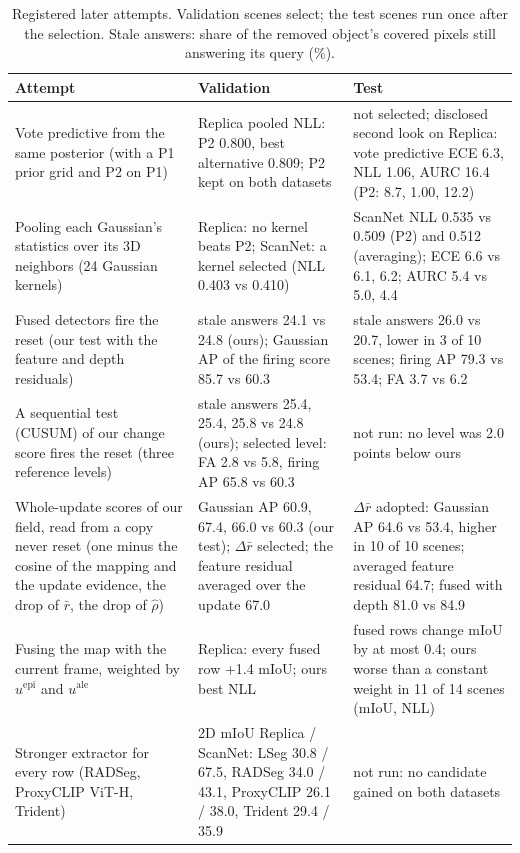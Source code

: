 \documentclass[journal]{IEEEtran}
\begin{document}
\begin{table}[t]
\centering
\caption{Registered later attempts. Validation scenes select; the test scenes run once after the selection. Stale answers: share of the removed object's covered pixels still answering its query (\%).}
\label{tab:attempts}
\footnotesize
\setlength{\tabcolsep}{3pt}
\begin{tabular}{@{}p{}p{}p{}@{}}
\toprule
Attempt & Validation & Test\\
\midrule
Vote predictive from the same posterior (with a P1 prior grid and P2 on P1) & Replica pooled NLL: P2 0.800, best alternative 0.809; P2 kept on both datasets & not selected; disclosed second look on Replica: vote predictive ECE 6.3, NLL 1.06, AURC 16.4 (P2: 8.7, 1.00, 12.2)\\
Pooling each Gaussian's statistics over its 3D neighbors (24 Gaussian kernels) & Replica: no kernel beats P2; ScanNet: a kernel selected (NLL 0.403 vs 0.410) & ScanNet NLL 0.535 vs 0.509 (P2) and 0.512 (averaging); ECE 6.6 vs 6.1, 6.2; AURC 5.4 vs 5.0, 4.4\\
Fused detectors fire the reset (our test with the feature and depth residuals) & stale answers 24.1 vs 24.8 (ours); Gaussian AP of the firing score 85.7 vs 60.3 & stale answers 26.0 vs 20.7, lower in 3 of 10 scenes; firing AP 79.3 vs 53.4; FA 3.7 vs 6.2\\
A sequential test (CUSUM) of our change score fires the reset (three reference levels) & stale answers 25.4, 25.4, 25.8 vs 24.8 (ours); selected level: FA 2.8 vs 5.8, firing AP 65.8 vs 60.3 & not run: no level was 2.0 points below ours\\
Whole-update scores of our field, read from a copy never reset (one minus the cosine of the mapping and the update evidence, the drop of $\bar r$, the drop of $\hat\rho$) & Gaussian AP 60.9, 67.4, 66.0 vs 60.3 (our test); $\Delta\bar r$ selected; the feature residual averaged over the update 67.0 & $\Delta\bar r$ adopted: Gaussian AP 64.6 vs 53.4, higher in 10 of 10 scenes; averaged feature residual 64.7; fused with depth 81.0 vs 84.9\\
Fusing the map with the current frame, weighted by $u^{\mathrm{epi}}$ and $u^{\mathrm{ale}}$ & Replica: every fused row +1.4 mIoU; ours best NLL & fused rows change mIoU by at most 0.4; ours worse than a constant weight in 11 of 14 scenes (mIoU, NLL)\\
Stronger extractor for every row (RADSeg, ProxyCLIP ViT-H, Trident) & 2D mIoU Replica / ScanNet: LSeg 30.8 / 67.5, RADSeg 34.0 / 43.1, ProxyCLIP 26.1 / 38.0, Trident 29.4 / 35.9 & not run: no candidate gained on both datasets\\
\bottomrule
\end{tabular}
\end{table}
\end{document}
